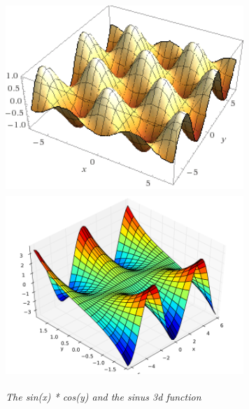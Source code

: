 \documentclass[article]{report}         %
\begin{document}
            \begin{figure}[h]
              \includegraphics[width=9cm, height=7cm]{images/Terrain/1.png}
              \includegraphics[width=9cm, height=7cm]{images/Terrain/2.png}
              \begin{center}\it The sin(x) * cos(y) and the sinus 3d function\end{center}
            \end{figure}
\end{document}
